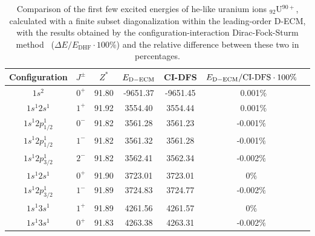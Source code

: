 \begin{table}[h!]
\begin{tabular}{cc|ccccc}
  Configuration & $J^{\pm}$ & $Z^{*}$ & $E_{\rm{D-ECM}}$ & CI-DFS
  & $E_{\rm{D-ECM}}/\text{CI-DFS} \cdot 100\%$ \\
  \hline
 \hline 
   $1s^2$ & $0^+$ & 91.80 & -9651.37 & -9651.45 & ~0.001$\%$ \\
  $1s^1 2s^1$ & $1^+$ & 91.92 & 3554.40 & 3554.44 & ~0.001$\%$\\
  $1s^1 2p^1_{1/2}$ & $0^-$  & 91.82 & 3561.28 & 3561.23 & -0.001$\%$\\
   $1s^1 2p^1_{1/2}$ & $1^-$ & 91.82  & 3561.32  & 3561.28 &-0.001$\%$ \\
   $1s^1 2p^1_{3/2}$ & $2^-$ & 91.82 & 3562.41 & 3562.34 & -0.002$\%$ \\
  $1s^1 2s^1$ & $0^+$ & 91.90 & 3723.01  & 3723.01 & 0$\%$  \\
  $1s^1 2p^1_{3/2}$ & $1^-$ & 91.89 & 3724.83  & 3724.77 &-0.002$\%$ \\
  $1s^1 3s^1$ & $1^+$ & 91.89 & 4261.56 & 4261.57 & 0$\%$ \\
  $1s^1 3s^1$ & $0^+$ & 91.83 & 4263.38 & 4263.31 & -0.002$\%$ \\
  \hline
\end{tabular}
  \caption{Comparison of the first few excited energies of he-like uranium ions ${}_{92}$U$^{90+}$,       calculated with a finite subset diagonalization within the leading-order D-ECM, with the results obtained by the configuration-interaction Dirac-Fock-Sturm method~\cite{Tup2003OS} ($\Delta E/E_{\mathrm{DHF}} \cdot 100\%$) and the relative difference between these two in percentages.}
  \label{tab:Ions}
\end{table}

\vspace{2cm}

